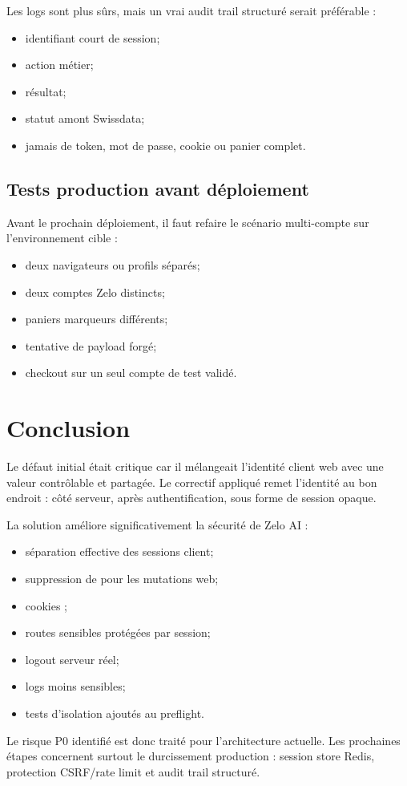 \documentclass[11pt,a4paper]{article}
\newcommand{\code}[1]{\texttt{\detokenize{#1}}}
\begin{document}
Les logs sont plus sûrs, mais un vrai audit trail structuré serait préférable :
\begin{itemize}
  \item identifiant court de session;
  \item action métier;
  \item résultat;
  \item statut amont Swissdata;
  \item jamais de token, mot de passe, cookie ou panier complet.
\end{itemize}

\subsection{Tests production avant déploiement}

Avant le prochain déploiement, il faut refaire le scénario multi-compte sur
l'environnement cible :
\begin{itemize}
  \item deux navigateurs ou profils séparés;
  \item deux comptes Zelo distincts;
  \item paniers marqueurs différents;
  \item tentative de payload forgé;
  \item checkout sur un seul compte de test validé.
\end{itemize}

\section{Conclusion}

Le défaut initial était critique car il mélangeait l'identité client web avec
une valeur contrôlable et partagée. Le correctif appliqué remet l'identité au
bon endroit : côté serveur, après authentification, sous forme de session
opaque.

La solution améliore significativement la sécurité de Zelo AI :
\begin{itemize}
  \item séparation effective des sessions client;
  \item suppression de \code{local-dev} pour les mutations web;
  \item cookies \code{HttpOnly};
  \item routes sensibles protégées par session;
  \item logout serveur réel;
  \item logs moins sensibles;
  \item tests d'isolation ajoutés au preflight.
\end{itemize}

Le risque P0 identifié est donc traité pour l'architecture actuelle. Les
prochaines étapes concernent surtout le durcissement production : session store
Redis, protection CSRF/rate limit et audit trail structuré.
\end{document}
